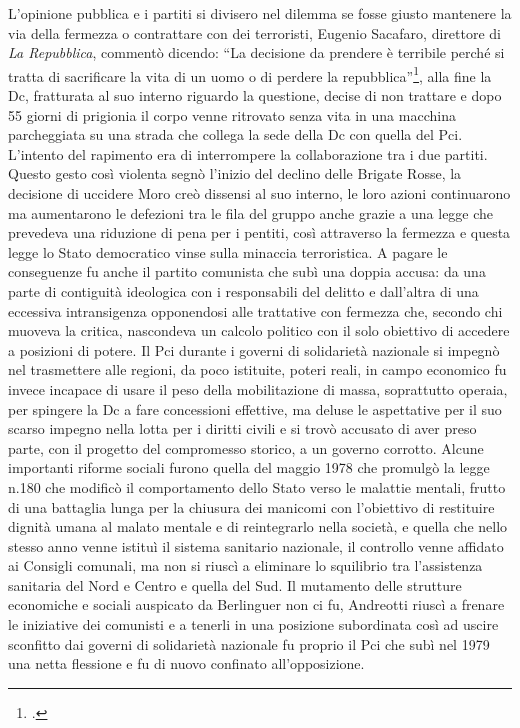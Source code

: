L'opinione pubblica e i partiti si divisero nel dilemma se fosse giusto mantenere la via della fermezza o contrattare con dei terroristi, Eugenio Sacafaro, direttore di \textit{La Repubblica}, commentò dicendo: \enquote{La decisione da prendere è terribile perché si tratta di sacrificare la vita di un uomo o di perdere la repubblica}\footcite{Ginsborg6}, alla fine la Dc, fratturata al suo interno riguardo la questione, decise di non trattare e dopo 55 giorni di prigionia il corpo venne ritrovato senza vita in una macchina parcheggiata su una strada che collega la sede della Dc con quella del Pci.
L'intento del rapimento era di interrompere la collaborazione tra i due partiti.
Questo gesto così violenta segnò l'inizio del declino delle Brigate Rosse, la decisione di uccidere Moro creò dissensi al suo interno, le loro azioni continuarono ma aumentarono le defezioni tra le fila del gruppo anche grazie a una legge che prevedeva una riduzione di pena per i pentiti, così attraverso la fermezza e questa legge lo Stato democratico vinse sulla minaccia terroristica.
A pagare le conseguenze fu anche il partito comunista che subì una doppia accusa: da una parte di contiguità ideologica con i responsabili del delitto e dall'altra di una eccessiva intransigenza opponendosi alle trattative con fermezza che, secondo chi muoveva la critica, nascondeva un calcolo politico con il solo obiettivo di accedere a posizioni di potere.
Il Pci durante i governi di solidarietà nazionale si impegnò nel trasmettere alle regioni, da poco istituite, poteri reali, in campo economico fu invece incapace di usare il peso della mobilitazione di massa, soprattutto operaia, per spingere la Dc a fare concessioni effettive, ma deluse le aspettative per il suo scarso impegno nella lotta per i diritti civili e si trovò accusato di aver preso parte, con il progetto del compromesso storico, a un governo corrotto.
Alcune importanti riforme sociali furono quella del maggio 1978 che promulgò la legge n.180 che modificò il comportamento dello Stato verso le malattie mentali, frutto di una battaglia lunga per la chiusura dei manicomi con l'obiettivo di restituire dignità umana al malato mentale e di reintegrarlo nella società, e quella che nello stesso anno venne istituì il sistema sanitario nazionale, il controllo venne affidato ai Consigli comunali, ma non si riuscì a eliminare lo squilibrio tra l'assistenza sanitaria del Nord e Centro e quella del Sud.
Il mutamento delle strutture economiche e sociali auspicato da Berlinguer non ci fu, Andreotti riuscì a frenare le iniziative dei comunisti e a tenerli in una posizione subordinata così ad uscire sconfitto dai governi di solidarietà nazionale fu proprio il Pci che subì nel 1979 una netta flessione e fu di nuovo confinato all'opposizione.
